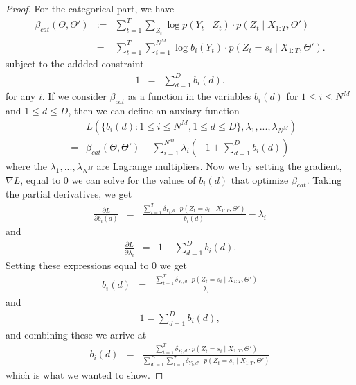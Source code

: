 \documentclass{amsart}
\begin{document}
\begin{proof}
For the categorical part, we have 
\begin{eqnarray*}
\beta_{cat}(\Theta,\Theta')&:=&\sum_{t=1}^T\sum_{Z_t}\log p(Y_t\mid Z_t)\cdot p(Z_t\mid X_{1:T},\Theta')\\
& = &\sum_{t=1}^T\sum_{i=1}^{N^M}\log b_{i}(Y_t)\cdot p(Z_t = s_i\mid X_{1:T},\Theta').
\end{eqnarray*}
subject to the addded constraint 
\begin{eqnarray*}
1 &=&\sum_{d=1}^Db_{i}(d).
\end{eqnarray*}
for any $i$.  If we consider $\beta_{cat}$ as a function 
in the variables $b_{i}(d)$ for $1\leq i\leq N^M$ and $1\leq d\leq D$, 
then we can define an auxiary function 
\begin{eqnarray*}
&&L(\{b_{i}(d):1\leq i\leq N^M, 1\leq d\leq 
D\},\lambda_1,...,\lambda_{N^M})\\
& = & \beta_{cat}(\Theta,\Theta') - 
\sum_{i=1}^{N^M}\lambda_i(-1+\sum_{d=1}^Db_{i}(d))
\end{eqnarray*} 
where the $\lambda_1,...,\lambda_{N^M}$ are Lagrange multipliers.  Now 
we by setting the gradient, $\nabla L$, equal to 0 we can solve for the 
values of $b_i(d)$ that optimize $\beta_{cat}$.  Taking the partial 
derivatives, we get
\begin{eqnarray*}
\frac{\partial L}{\partial b_i(d)} & = & 
\frac{\sum_{t=1}^T\delta_{Y_t,d}\cdot p(Z_t = s_i\mid 
X_{1:T},\Theta')}{b_i(d)} - \lambda_i 
\end{eqnarray*}
and 
\begin{eqnarray*}
\frac{\partial L}{\partial \lambda_i} & = & 1-\sum_{d=1}^Db_{i}(d).
\end{eqnarray*}
Setting these expressions equal to 0 we get 
\begin{eqnarray*}
b_i(d)& = & 
\frac{\sum_{t=1}^T\delta_{Y_t,d}\cdot p(Z_t = s_i\mid 
X_{1:T},\Theta')}{\lambda_i }
\end{eqnarray*}
and 
\begin{eqnarray*}
1=\sum_{d=1}^Db_{i}(d),
\end{eqnarray*}
and combining these we arrive at 
\begin{eqnarray*}
b_i(d)& = & 
\frac{\sum_{t=1}^T\delta_{Y_t,d}\cdot p(Z_t = s_i\mid 
X_{1:T},\Theta')}{\sum_{d'=1}^D\sum_{t=1}^T\delta_{Y_t,d'}\cdot p(Z_t = s_i\mid 
X_{1:T},\Theta')}
\end{eqnarray*}
which is what we wanted to show.


\end{proof}
\end{document}
